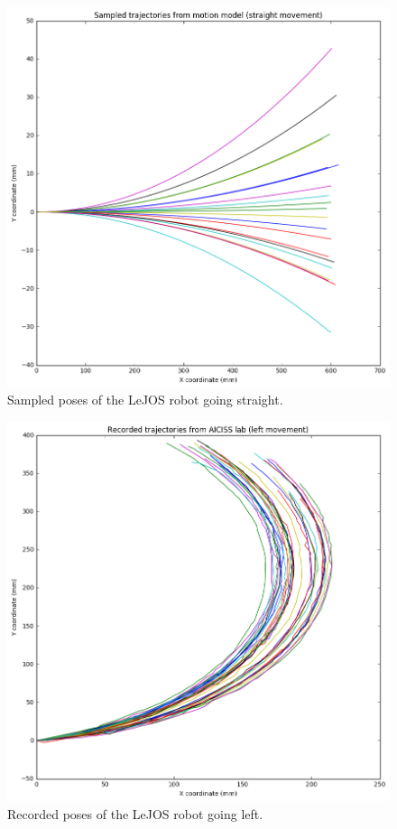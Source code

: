 \documentclass[paper=a4, fontsize=11pt]{scrartcl} %
\begin{document}
    \begin{figure}[h!]
        \begin{center}
            \setlength{\fboxsep}{0.5pt} %
            \setlength{\fboxrule}{0.5pt}
            \includegraphics[width=12cm,fbox]{images/sampled_poses_straight.png}
            \caption{Sampled poses of the LeJOS robot going straight.}
        \end{center}
    \end{figure}
    
    
    \begin{figure}[h!]
        \begin{center}
            \setlength{\fboxsep}{0.5pt} %
            \setlength{\fboxrule}{0.5pt}
            \includegraphics[width=12cm,fbox]{images/recorded_poses_left.png}
            \caption{Recorded poses of the LeJOS robot going left.}
        \end{center}
    \end{figure}
\end{document}
